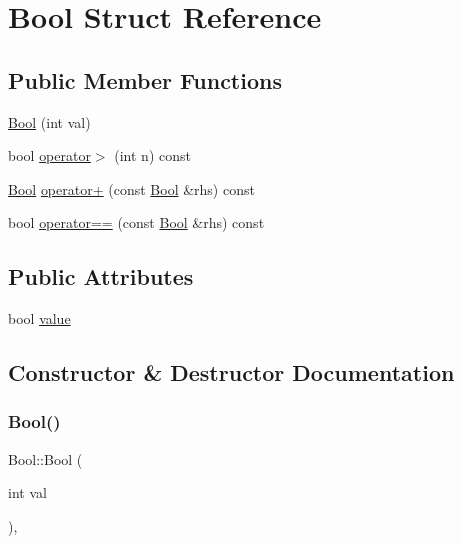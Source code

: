 \hypertarget{structBool}{}\section{Bool Struct Reference}
\label{structBool}
\subsection*{Public Member Functions}
\begin{DoxyCompactItemize}
\item 
\mbox{\hyperlink{structBool_a03dfd4851b13abb29414887fcada7fca}{Bool}} (int val)
\item 
bool \mbox{\hyperlink{structBool_a7baecbc58992eb06157fbbbaa560be0b}{operator$>$}} (int n) const
\item 
\mbox{\hyperlink{structBool}{Bool}} \mbox{\hyperlink{structBool_a6f4ecdec19082e896cffce66e6b6e7cc}{operator+}} (const \mbox{\hyperlink{structBool}{Bool}} \&rhs) const
\item 
bool \mbox{\hyperlink{structBool_afe799a4977c5ebe4c215d5d4ebd77adb}{operator==}} (const \mbox{\hyperlink{structBool}{Bool}} \&rhs) const
\end{DoxyCompactItemize}
\subsection*{Public Attributes}
\begin{DoxyCompactItemize}
\item 
bool \mbox{\hyperlink{structBool_a16be863c269f988cdcbe59f9d846a141}{value}}
\end{DoxyCompactItemize}


\subsection{Constructor \& Destructor Documentation}
\mbox{\label{structBool_a03dfd4851b13abb29414887fcada7fca}} 
\subsubsection{\texorpdfstring{Bool()}{Bool()}}
{\footnotesize\ttfamily Bool\+::\+Bool (\begin{DoxyParamCaption}\item[{int}]{val }\end{DoxyParamCaption})\hspace{0.3cm}{\ttfamily [inline]}, {\ttfamily [explicit]}}



